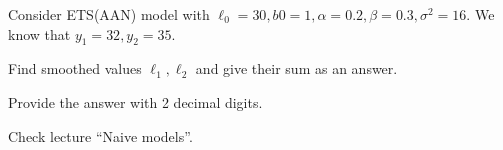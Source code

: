 
\begin{question}
Consider ETS(AAN) model with \(\ell_0 = 30, b0 = 1, \alpha=0.2,\beta=0.3,\sigma^2=16\). We know that \(y_1=32,y_2=35\).

Find smoothed values \(\ell_1,\ell_2\) and give their sum as an answer.

Provide the answer with 2 decimal digits.
\end{question}

\begin{solution}
Check lecture ``Naive models''.
\end{solution}

